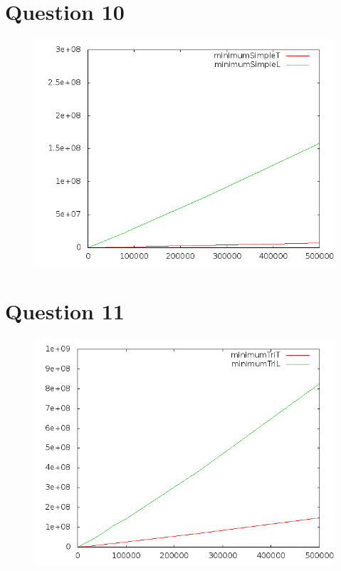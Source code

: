 \documentclass[a4paper,12pt]{report}
\begin{document}
\section*{Question 10}
\begin{figure}[!ht]
	\center
	\includegraphics[scale=0.4]{q10.png}
\end{figure}

\section*{Question 11}
\begin{figure}[!ht]
	\center
	\includegraphics[scale=0.4]{q11.png}
\end{figure}
\end{document}
